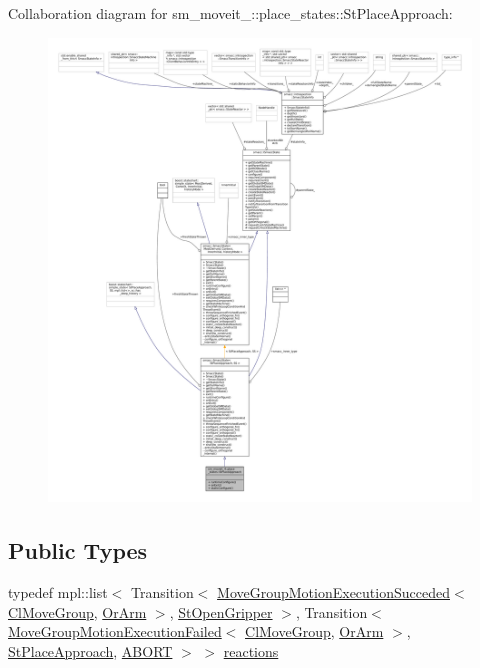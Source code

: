Collaboration diagram for sm\+\_\+moveit\+\_\+:\+:place\+\_\+states\+:\+:St\+Place\+Approach\+:
\nopagebreak
\begin{figure}[H]
\begin{center}
\leavevmode
\includegraphics[width=350pt]{structsm__moveit__4_1_1place__states_1_1StPlaceApproach__coll__graph}
\end{center}
\end{figure}
\subsection*{Public Types}
\begin{DoxyCompactItemize}
\item 
typedef mpl\+::list$<$ Transition$<$ \hyperlink{structmoveit__z__client_1_1MoveGroupMotionExecutionSucceded}{Move\+Group\+Motion\+Execution\+Succeded}$<$ \hyperlink{classmoveit__z__client_1_1ClMoveGroup}{Cl\+Move\+Group}, \hyperlink{classsm__moveit__4_1_1OrArm}{Or\+Arm} $>$, \hyperlink{structsm__moveit__4_1_1place__states_1_1StOpenGripper}{St\+Open\+Gripper} $>$, Transition$<$ \hyperlink{structmoveit__z__client_1_1MoveGroupMotionExecutionFailed}{Move\+Group\+Motion\+Execution\+Failed}$<$ \hyperlink{classmoveit__z__client_1_1ClMoveGroup}{Cl\+Move\+Group}, \hyperlink{classsm__moveit__4_1_1OrArm}{Or\+Arm} $>$, \hyperlink{structsm__moveit__4_1_1place__states_1_1StPlaceApproach}{St\+Place\+Approach}, \hyperlink{classABORT}{A\+B\+O\+RT} $>$ $>$ \hyperlink{structsm__moveit__4_1_1place__states_1_1StPlaceApproach_a9aed5942585d30a8f47a96e749f6fa6a}{reactions}
\end{DoxyCompactItemize}
